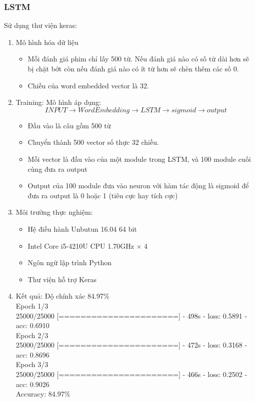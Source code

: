 \documentclass[a4paper,12pt]{report}
\begin{document}
\subsubsection{LSTM}
Sử dụng thư viện keras:
\begin{enumerate}
\item Mô hình hóa dữ liệu
\begin{itemize}
\item Mỗi đánh giá phim chỉ lấy 500 từ. Nếu đánh giá nào có số từ dài hơn sẽ bị chặt bớt còn nếu đánh giá nào có ít từ hơn sẽ chèn thêm các số 0.
\item Chiều của word embedded vector là 32.
\end{itemize}
\item Training: Mô hình áp dụng:
$$ INPUT \rightarrow WordEmbedding \rightarrow LSTM \rightarrow sigmoid \rightarrow output$$
\begin{itemize}
\item Đầu vào là câu gồm 500 từ
\item Chuyển thành 500 vector số thực 32 chiều.
\item Mỗi vector là đầu vào của một module trong LSTM, và 100 module cuối cùng đưa ra output 
\item Output của 100 module đưa vào neuron với hàm tác động là sigmoid để đưa ra output là 0 hoặc 1 (tiêu cực hay tích cực)
\end{itemize}
\item Môi trường thực nghiệm:
\begin{itemize}
\item Hệ điều hành Unbutun 16.04 64 bit
\item Intel Core i5-4210U CPU 1.70GHz $\times$ 4
\item Ngôn ngữ lập trình Python
\item Thư viện hỗ trợ Keras
\end{itemize}
\item Kết quả: Độ chính xác 84.97\%
\\[0.5cm]{\small
Epoch 1/3\\
25000/25000 [======================] - 498s - loss: 0.5891 - acc: 0.6910\\
Epoch 2/3\\
25000/25000 [======================] - 472s - loss: 0.3168 - acc: 0.8696\\   
Epoch 3/3\\
25000/25000 [======================] - 466s - loss: 0.2502 - acc: 0.9026\\
Accuracy: 84.97\% \\
}
\end{enumerate}
\end{document}
